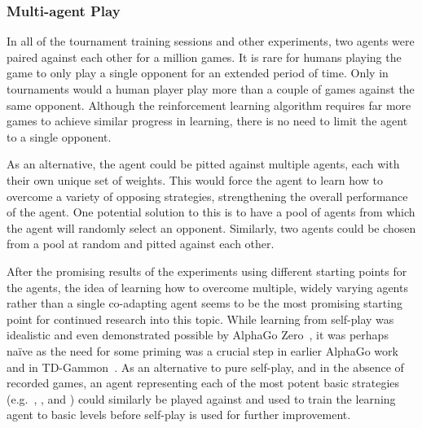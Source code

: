 
\subsubsection*{Multi-agent Play}
\label{sec:disc-future-rr}


In all of the tournament training sessions and other experiments,
two agents were paired against each other for a million games.
%
%
It is rare for humans playing the game to only play a single opponent
for an extended period of time.
%
Only in tournaments would a human player play more than a couple of games
against the same opponent.
%
Although the reinforcement learning algorithm requires far more games to
achieve similar progress in learning,
there is no need to limit the agent to a single opponent.

As an alternative,
the agent could be pitted against multiple agents,
each with their own unique set of
weights.
%
This would force the agent to learn how to overcome a variety of opposing
strategies,
strengthening the overall performance of the agent.
%
One potential solution to this is to have a pool of agents
from which the agent will randomly select an opponent.
%
Similarly,
two agents could be chosen from a pool at random and pitted against each
other.

After the promising results of the experiments using different starting points
for the agents,
the idea of learning how to overcome multiple, widely varying agents
rather than a single co-adapting agent
seems to be the most promising starting point for continued research into this
topic.
%
While learning from self-play was idealistic
and even demonstrated possible by AlphaGo Zero~\cite{deepmind_alphago_zero},
it was perhaps naïve as
the need for some priming was a crucial step in earlier AlphaGo
work~\cite{deepmind_alphago} and in TD-Gammon~\cite{tdgammon}.
%
As an alternative to pure self-play,
and in the absence of recorded games,
an agent representing each of the most potent basic strategies
(e.g.\  \handmaxavg, \handmaxmin, and \handmaxposs)
could similarly be played against and used to train the learning agent
to basic levels before self-play is used for further improvement.


